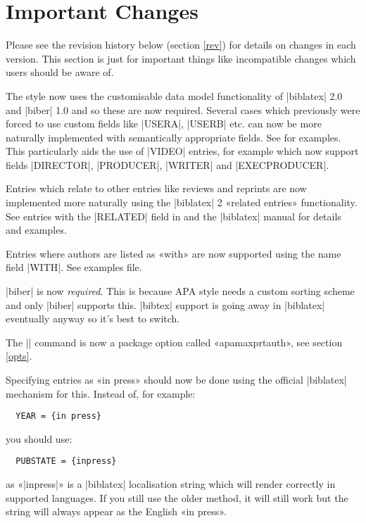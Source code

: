 \documentclass{ltxdockit}
\begin{document}
\printtitlepage
\tableofcontents

\section{Important Changes}\label{special}

Please see the revision history below (section \ref{rev}) for  details on changes in each
version. This section is just for important things like incompatible
changes which users should be aware of.

The style now uses the customisable data model functionality of |biblatex|
2.0 and |biber| 1.0 and so these are now required. Several cases
which previously were forced to use custom fields like |USERA|,
|USERB| etc. can now be more naturally implemented with semantically
appropriate fields. See  for
examples. This particularly aids the use of |VIDEO| entries, for
example which now support fields |DIRECTOR|, |PRODUCER|,
|WRITER| and |EXECPRODUCER|.

Entries which relate to other entries like reviews and reprints are
now implemented more naturally using the |biblatex| 2 «related
entries» functionality. See entries with the |RELATED| field in
 and the |biblatex| manual for
details and examples.

Entries where authors are listed as «with» are now supported using the
name field |WITH|. See examples file.

|biber| is now \emph{required}. This is because APA style needs a custom
sorting scheme and only |biber| supports this. |bibtex| support is going
away in |biblatex| eventually anyway so it's best to switch.

The |\maxprtauth| command is now a package option called
«apamaxprtauth», see section \ref{opts}.

Specifying entries as «in press» should now be done using the official |biblatex|
mechanism for this. Instead of, for example:

\begin{verbatim}
  YEAR = {in press}
\end{verbatim}

\noindent you should use:

\begin{verbatim}
  PUBSTATE = {inpress}
\end{verbatim}

\noindent as «|inpress|» is a |biblatex| localisation string which will
render correctly in supported languages. If you still use the older method,
it will still work but the string will always appear as the English «in
press».
\end{document}
